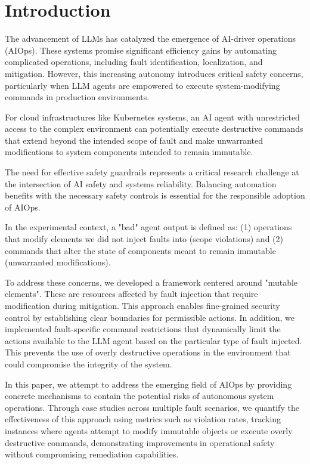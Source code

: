 \section{Introduction}
\label{sec:introduction}

The advancement of LLMs has catalyzed the emergence of AI-driver operations (AIOps). These systems promise significant efficiency gains by automating complicated operations, including fault identification, localization, and mitigation. However, this increasing autonomy introduces critical safety concerns, particularly when LLM agents are empowered to execute system-modifying commands in production environments.

For cloud infrastructures like Kubernetes systems, an AI agent with unrestricted access to the complex environment can potentially execute destructive commands that extend beyond the intended scope of fault and make unwarranted modifications to system components intended to remain immutable. 

The need for effective safety guardrails represents a critical research challenge at the intersection of AI safety and systems reliability. Balancing automation benefits with the necessary safety controls is essential for the responsible adoption of AIOps.

In the experimental context, a "bad" agent output is defined as: (1) operations that modify elements we did not inject faults into (scope violations) and (2) commands that alter the state of components meant to remain immutable (unwarranted modifications).

To address these concerns, we developed a framework centered around "mutable elements". These are resources affected by fault injection that require modification during mitigation. This approach enables fine-grained security control by establishing clear boundaries for permissible actions. In addition, we implemented fault-specific command restrictions that dynamically limit the actions available to the LLM agent based on the particular type of fault injected. This prevents the use of overly destructive operations in the environment that could compromise the integrity of the system.

In this paper, we attempt to address the emerging field of AIOps by providing concrete mechanisms to contain the potential risks of autonomous system operations. Through case studies across multiple fault scenarios, we quantify the effectiveness of this approach using metrics such as violation rates, tracking instances where agents attempt to modify immutable objects or execute overly destructive commands, demonstrating improvements in operational safety without compromising remediation capabilities.

